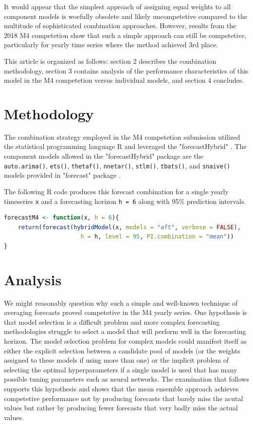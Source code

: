 \documentclass[11pt,3p,review,authoryear]{elsarticle}
\begin{document}
It would appear that the simplest approach of assigning equal weights to all component models is woefully obsolete and likely uncompetetive compared to the multitude of sophisticated combination approaches. However, results from the 2018 M4 competetion show that such a simple approach can still be competetive, particularly for yearly time series where the method achieved 3rd place.

This article is organized as follows: section 2 describes the combination methodology, section 3 contains analysis of the performance characteristics of this model in the M4 competetion versus individual models, and section 4 concludes.

\section{Methodology}
The combination strategy employed in the M4 competetion submission utilized the statistical programming language R \citep{Rlang} and leveraged the "forecastHybrid" \citep{forecastHybrid}. The component models allowed in the "forecastHybrid" package are the  \lstinline{auto.arima()}, \lstinline{ets()}, \lstinline{thetaf()}, \lstinline{nnetar()}, \lstinline{stlm()}, \lstinline{tbats()}, and \lstinline{snaive()} models provided in "forecast" package \citep{Forecast}.


The following R code produces this forecast combination for a single yearly timeseries \lstinline{x} and a forecasting horizon \lstinline{h = 6} along with 95\% prediction intervals.
\begin{lstlisting}[language=R]
forecastM4 <- function(x, h = 6){
    return(forecast(hybridModel(x, models = "aft", verbose = FALSE),
                      h = h, level = 95, PI.combination = "mean"))
}
\end{lstlisting}

\section{Analysis}
We might reasonably question why such a simple and well-known technique of averaging forecasts proved competetive in the M4 yearly series. One hypothesis is that model selection is a difficult problem and more complex forecasting methodologies struggle to select a model that will perform well in the forecasting horizon. The model selection problem for complex models could manifest itself as either the explicit selection between a candidate pool of models (or the weights assigned to these models if using more than one) or the implicit problem of selecting the optimal hyperparameters if a single model is used that has many possible tuning parameters such as neural networks. The examination that follows supports this hypothesis and shows that the mean ensemble approach achieves competetive performance not by producing forecasts that barely miss the acutal values but rather by producing fewer forecasts that very badly miss the actual values.
\end{document}

